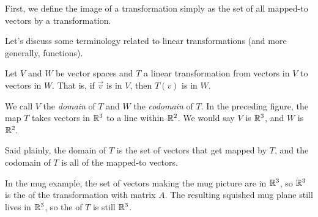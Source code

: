 \documentclass{ximera}
\begin{document}
\begin{center}
\end{center}


First, we define the image of a transformation simply as the set of all mapped-to vectors by a transformation.

Let's discuss some terminology related to linear transformations (and more generally, functions). 

\begin{definition}
  Let $V$ and $W$ be vector spaces and $T$ a linear transformation from vectors in $V$ to vectors in $W$. That is, if $\vec{v}$ is in $V$, then $T(v)$ is in $W$.

  \begin{center}
    \end{center}

  We call $V$ the \emph{domain} of $T$ and $W$ the \emph{codomain} of $T$. In the preceding figure, the map $T$ takes vectors in $\mathbb{R}^3$ to a line within $\mathbb{R}^2$. We would say $V$ is $\mathbb{R}^3$, and $W$ is $\mathbb{R}^2$.
\end{definition}

Said plainly, the domain of $T$ is the set of vectors that get mapped by $T$, and the codomain of $T$ is all of the mapped-to vectors. 

In the mug example, the set of vectors making the mug picture are in $\mathbb{R}^3$, so $\mathbb{R}^3$ is the  of the transformation with matrix $A$. The resulting squished mug plane still lives in $\mathbb{R}^3$, so the  of $T$ is still $\mathbb{R}^3$. 
\end{document}
